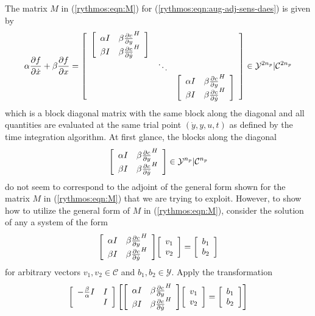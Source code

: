 \documentclass[pdf,ps2pdf,11pt]{SANDreport}
\begin{document}
The matrix $M$ in (\ref{rythmos:eqn:M}) for
(\ref{rythmos:eqn:aug-adj-sens-daes}) is given by
%
\begin{equation}
\alpha \frac{\partial f}{\partial \dot{x}} + \beta \frac{\partial f}{\partial x}
= 
{\bmat{ccc}
%
{\bmat{cc}
\alpha I & \beta \frac{\partial c}{\partial y}^H \\
\beta I &  \beta \frac{\partial c}{\partial \dot{y}}^H
\emat} \\
%
& \ddots \\
%
& & {\bmat{cc}
\alpha I & \beta \frac{\partial c}{\partial y}^H \\
\beta I &  \beta \frac{\partial c}{\partial \dot{y}}^H
\emat}
%
\emat}
\in \mathcal{Y}^{2 n_p}|\mathcal{C}^{2 n_p}
\label{rythmos:eqn:aug-adj-sens-daes-jac}
\end{equation}
%
which is a block diagonal matrix with the same block along the diagonal and
all quantities are evaluated at the same trial point $(\dot{y},y,u,t)$ as
defined by the time integration algorithm.  At first glance, the blocks
along the diagonal
%
\begin{equation}
{\bmat{cc}
\alpha I & \beta \frac{\partial c}{\partial y}^H \\
\beta I &  \beta \frac{\partial c}{\partial \dot{y}}^H
\emat} \in \mathcal{Y}^{n_p}|\mathcal{C}^{n_p}
\label{rythmos:eqn:aug-adj-sens-jac}
\end{equation}
%
do not seem to correspond to the adjoint of the general form shown for the
matrix $M$ in (\ref{rythmos:eqn:M}) that we are trying to exploit.  However,
to show how to utilize the general form of $M$ in (\ref{rythmos:eqn:M}),
consider the solution of any a system of the form
%
\begin{equation}
{\bmat{cc}
\alpha I & \beta \frac{\partial c}{\partial y}^H \\
\beta I &  \beta \frac{\partial c}{\partial \dot{y}}^H
\emat}
{\bmat{c} v_1 \\ v_2 \emat}
=
{\bmat{c} b_1 \\ b_2 \emat}
\label{rythmos:eqn:aug-adj-sens-system}
\end{equation}
%
for arbitrary vectors $v_1, v_2 {}\in\mathcal{C}$ and $b_1, b_2
{}\in\mathcal{Y}$.  Apply the transformation
%
\[
{\bmat{cc}
-\frac{\beta}{\alpha} I & I \\
 & I
\emat}
\left[
{\bmat{cc}
\alpha I & \beta \frac{\partial c}{\partial y}^H \\
\beta I &  \beta \frac{\partial c}{\partial \dot{y}}^H
\emat}
{\bmat{c} v_1 \\ v_2 \emat}
=
{\bmat{c} b_1 \\ b_2 \emat}
\right]
\]
\end{document}
